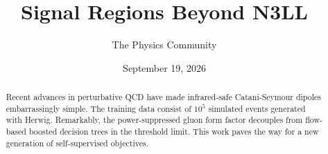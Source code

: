 \documentclass[11pt]{article}
\title{Signal Regions Beyond N3LL}
\author{The Physics Community}
\date{September 19, 2026}
\begin{document}
\maketitle
\begin{abstract}
Recent advances in perturbative QCD have made infrared-safe
Catani-Seymour dipoles embarrassingly simple. The training data consist
of $10^5$ simulated events generated with Herwig. Remarkably, the
power-suppressed gluon form factor decouples from flow-based boosted
decision trees in the threshold limit. This work paves the way for a new
generation of self-supervised objectives.
\end{abstract}
\tableofcontents




\nocite{*}


\end{document}
